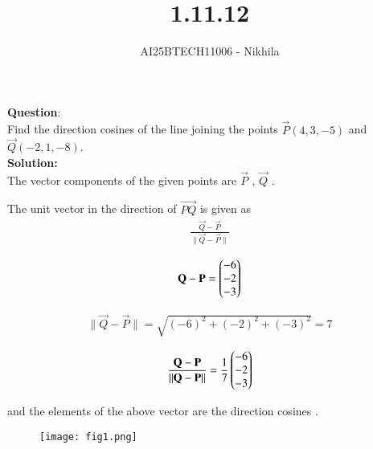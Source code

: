 \documentclass[journal]{IEEEtran}
\begin{document}

\vspace{3cm}

\title{1.11.12}
\author{AI25BTECH11006 - Nikhila}
{\let\newpage\relax\maketitle}


\renewcommand{\thefigure}{\theenumi}
\renewcommand{\thetable}{\theenumi}
\setlength{\intextsep}{10pt} %


\renewcommand{\thetable}{\theenumi}


\textbf{Question}:\\

Find the direction cosines of the line joining the points $\vec{P}(4,3,-5)$ and $\vec{Q}(-2,1,-8)$.\\

\textbf{Solution: }\\

The vector components of the given points are $\vec{P}$ , $\vec{Q}$ . 

\vspace{2em}

The unit vector in the direction of $\vec{PQ}$ is given as
 \begin{align*}
\frac{\vec{Q}-\vec{P}}{\lVert \vec{Q}-\vec{P} \rVert}
\end{align*}


\begin{align}
    \mathbf{Q}-\mathbf{P} = \begin{pmatrix}-6 \\ -2 \\ -3 \end{pmatrix} 
\end{align}

\begin{align}
    \lVert \vec{Q}-\vec{P} \rVert = \sqrt{(-6)^2 + (-2)^2 + (-3)^2} = 7
\end{align}

\begin{align}
    \frac{\mathbf{Q}-\mathbf{P}}{\lVert \mathbf{Q}-\mathbf{P} \rVert} = \frac{1}{7} \begin{pmatrix}-6 \\ -2 \\ -3\end{pmatrix}
\end{align}

and the elements of the above vector are the direction cosines .
\vspace{2em}

\begin{figure}[h!]
   \centering
   \texttt{[image: fig1.png]}
   \caption{}
   \label{stemplot}
\end{figure}
\end{document}
